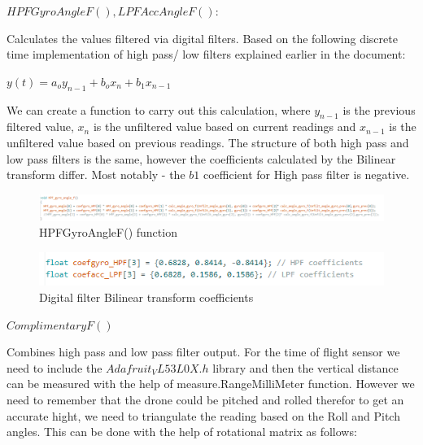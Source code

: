 $HPFGyroAngleF(), LPFAccAngleF():$\newline

Calculates the values filtered via digital filters. Based on the following discrete time implementation of high pass/ low filters explained earlier in the document:

$y(t)=a_o y_{n-1}+b_ox_n+b_1x_{n-1}  $


We can create a function to carry out this calculation, where $y_{n-1}$ is the previous filtered value, $x_n$ is the unfiltered value based on current readings and $x_{n-1}$ is the unfiltered value based on previous readings. The structure of both high pass and low pass filters is the same, however the coefficients calculated by the Bilinear transform differ. Most notably - the 
$b1$ coefficient for High pass filter is negative.

\begin{figure}[H]
    \begin{center}
    \includegraphics[scale = 0.85]{pictures/IMU/HPF_gyro.png}
    \end{center}
    \caption{HPFGyroAngleF() function}
    \label{fig:my_label}
\end{figure}

\begin{figure}[H]
    \begin{center}
    \includegraphics[scale = 0.85]{pictures/IMU/HPF_LPF_coefff.png}
    \end{center}
    \caption{Digital filter Bilinear transform coefficients}
    \label{fig:my_label}
\end{figure}


$ComplimentaryF()$
\newline

Combines high pass and low pass filter output.
For the time of flight sensor we need to include the $Adafruit_VL53L0X.h$ library and then the vertical distance can be measured with the help of measure.RangeMilliMeter function.
However we need to remember that the drone could be pitched and rolled therefor to get an accurate hight, we need to triangulate the reading based on the Roll and Pitch angles.
This can be done with the help of rotational matrix as follows:


